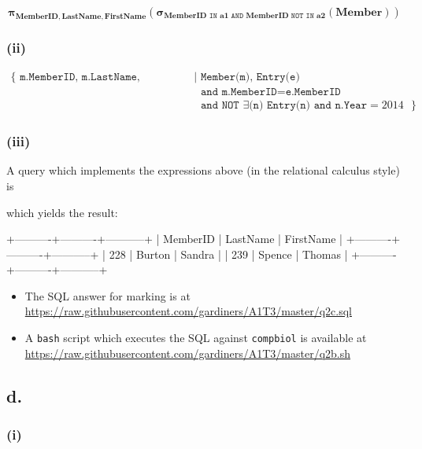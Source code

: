 \documentclass{article}
\newcommand{\select}[1]{
\boldsymbol{\sigma}_{#1}
}
\newcommand{\project}[1]{
\boldsymbol{\pi}_{#1}
}
\begin{document}
$$
\project{\mathbf{MemberID, LastName, FirstName}}
\left(
    \select{\mathbf{MemberID} \texttt{ IN } \mathbf{a1} \texttt{ AND } \mathbf{MemberID} \texttt{ NOT IN } \mathbf{a2}}
    \left(\mathbf{Member}\right)\right)
$$

\subsubsection{(ii)}

$$
\begin{aligned}
\{
\texttt{ m.MemberID, m.LastName, m.FirstName } | &\texttt{ Member(m), Entry(e)} \\
    &\texttt{ and m.MemberID} = \texttt{e.MemberID} \\
    &\texttt{ and NOT } \exists \texttt{(n) Entry(n) and n.Year} = 2014
\texttt{ } \}
\end{aligned}
$$

\subsubsection{(iii)}

A query which implements the expressions above (in the relational calculus style) is


which yields the result:

\begin{bashinline}
+----------+----------+-----------+
| MemberID | LastName | FirstName |
+----------+----------+-----------+
|      228 | Burton   | Sandra    |
|      239 | Spence   | Thomas    |
+----------+----------+-----------+
\end{bashinline}

\begin{itemize}
    \item The SQL answer for marking is at \url{https://raw.githubusercontent.com/gardiners/A1T3/master/q2c.sql}
    \item A \texttt{bash} script which executes the SQL against \texttt{compbiol} is available at  \url{https://raw.githubusercontent.com/gardiners/A1T3/master/q2b.sh}
\end{itemize}

\subsection{d.}

\subsubsection{(i)}
\end{document}
